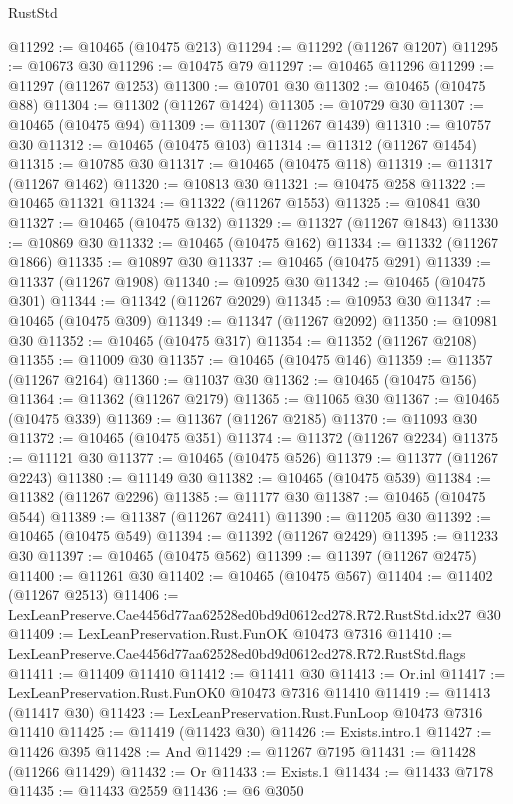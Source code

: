 \begin{lexlean}{RustStd}
\begin{coremodule}
@11292 := @10465 (@10475 @213)
@11294 := @11292 (@11267 @1207)
@11295 := @10673 @30
@11296 := @10475 @79
@11297 := @10465 @11296
@11299 := @11297 (@11267 @1253)
@11300 := @10701 @30
@11302 := @10465 (@10475 @88)
@11304 := @11302 (@11267 @1424)
@11305 := @10729 @30
@11307 := @10465 (@10475 @94)
@11309 := @11307 (@11267 @1439)
@11310 := @10757 @30
@11312 := @10465 (@10475 @103)
@11314 := @11312 (@11267 @1454)
@11315 := @10785 @30
@11317 := @10465 (@10475 @118)
@11319 := @11317 (@11267 @1462)
@11320 := @10813 @30
@11321 := @10475 @258
@11322 := @10465 @11321
@11324 := @11322 (@11267 @1553)
@11325 := @10841 @30
@11327 := @10465 (@10475 @132)
@11329 := @11327 (@11267 @1843)
@11330 := @10869 @30
@11332 := @10465 (@10475 @162)
@11334 := @11332 (@11267 @1866)
@11335 := @10897 @30
@11337 := @10465 (@10475 @291)
@11339 := @11337 (@11267 @1908)
@11340 := @10925 @30
@11342 := @10465 (@10475 @301)
@11344 := @11342 (@11267 @2029)
@11345 := @10953 @30
@11347 := @10465 (@10475 @309)
@11349 := @11347 (@11267 @2092)
@11350 := @10981 @30
@11352 := @10465 (@10475 @317)
@11354 := @11352 (@11267 @2108)
@11355 := @11009 @30
@11357 := @10465 (@10475 @146)
@11359 := @11357 (@11267 @2164)
@11360 := @11037 @30
@11362 := @10465 (@10475 @156)
@11364 := @11362 (@11267 @2179)
@11365 := @11065 @30
@11367 := @10465 (@10475 @339)
@11369 := @11367 (@11267 @2185)
@11370 := @11093 @30
@11372 := @10465 (@10475 @351)
@11374 := @11372 (@11267 @2234)
@11375 := @11121 @30
@11377 := @10465 (@10475 @526)
@11379 := @11377 (@11267 @2243)
@11380 := @11149 @30
@11382 := @10465 (@10475 @539)
@11384 := @11382 (@11267 @2296)
@11385 := @11177 @30
@11387 := @10465 (@10475 @544)
@11389 := @11387 (@11267 @2411)
@11390 := @11205 @30
@11392 := @10465 (@10475 @549)
@11394 := @11392 (@11267 @2429)
@11395 := @11233 @30
@11397 := @10465 (@10475 @562)
@11399 := @11397 (@11267 @2475)
@11400 := @11261 @30
@11402 := @10465 (@10475 @567)
@11404 := @11402 (@11267 @2513)
@11406 := LexLeanPreserve.Cae4456d77aa62528ed0bd9d0612cd278.R72.RustStd.idx27 @30
@11409 := LexLeanPreservation.Rust.FunOK @10473 @7316
@11410 := LexLeanPreserve.Cae4456d77aa62528ed0bd9d0612cd278.R72.RustStd.flags
@11411 := @11409 @11410
@11412 := @11411 @30
@11413 := Or.inl
@11417 := LexLeanPreservation.Rust.FunOK0 @10473 @7316 @11410
@11419 := @11413 (@11417 @30)
@11423 := LexLeanPreservation.Rust.FunLoop @10473 @7316 @11410
@11425 := @11419 (@11423 @30)
@11426 := Exists.intro.{1}
@11427 := @11426 @395
@11428 := And
@11429 := @11267 @7195
@11431 := @11428 (@11266 @11429)
@11432 := Or
@11433 := Exists.{1}
@11434 := @11433 @7178
@11435 := @11433 @2559
@11436 := @6 @3050

\end{coremodule}
\end{lexlean}
